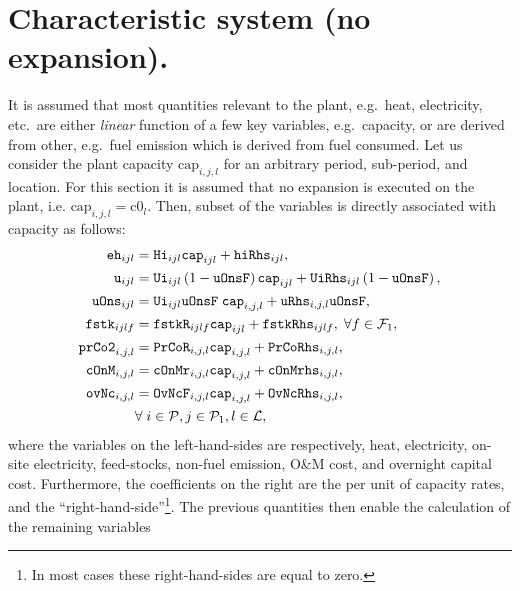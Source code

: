 \documentclass{amsart}
\begin{document}
\section{Characteristic system (no expansion).}\label{sec:char_sys}
%
It is assumed that most quantities relevant to the plant, e.g.\ heat,
electricity, etc.\ are either \emph{linear} function of a few key variables,
e.g.\ capacity, or are derived from other, e.g.\ fuel emission which is derived
from fuel consumed.  Let us consider the plant capacity $\text{cap}_{i,j,l}$ for
an arbitrary period, sub-period, and location.  For this section it is assumed
that no expansion is executed on the plant, i.e.
$\text{cap}_{i,j,l}=\text{c0}_{l}$.  Then, subset of the variables is directly
associated with capacity as follows:
%
\begin{align}\label{eq:eqset1}
    \mathtt{eh}_{ijl} &= \mathtt{Hi}_{ijl} \mathtt{cap}_{ijl} 
    + \mathtt{hiRhs}_{ijl}, \\
    \mathtt{u}_{ijl}  &= 
    \mathtt{Ui}_{ijl}\left(1-\mathtt{uOnsF}\right)\mathtt{cap}_{ijl} 
    + \mathtt{UiRhs}_{ijl} \left(1 - \mathtt{uOnsF}\right), \\
    \mathtt{uOns}_{ijl}  &= 
    \mathtt{Ui}_{ijl}  \mathtt{uOnsF} \; 
    \mathtt{cap}_{i,j,l} + \mathtt{uRhs}_{i,j,l} \mathtt{uOnsF}, \\
    \mathtt{fstk}_{ijlf}  &= 
    \mathtt{fstkR}_{ijlf}  
    \mathtt{cap}_{ijl} + \mathtt{fstkRhs}_{ijlf},\; \forall f \in \mathcal{F}_1, 
    \\
    \mathtt{prCo2}_{i,j,l} &= \mathtt{PrCoR}_{i,j,l} \mathtt{cap}_{i,j,l} 
    + \mathtt{PrCoRhs}_{i,j,l}, \\
    \mathtt{cOnM}_{i,j,l} &= 
    \mathtt{cOnMr}_{i,j,l} \mathtt{cap}_{i,j,l} +
    \mathtt{cOnMrhs}_{i,j,l},
    \\
    \mathtt{ovNc}_{i,j,l} &= \mathtt{OvNcF}_{i,j,l} \mathtt{cap}_{i,j,l}
    + \mathtt{OvNcRhs}_{i,j,l}, \\
    & \forall \; i \in \mathcal{P},j \in \mathcal{P}_1 ,
    l \in \mathcal{L}, \notag
\end{align}
%
where the variables on the left-hand-sides are respectively, heat, electricity,
on-site electricity, feed-stocks, non-fuel emission, O\&M cost, and overnight
capital cost.  Furthermore, the coefficients on the right are the per unit of
capacity rates, and the ``right-hand-side''\footnote{In most cases these
right-hand-sides are equal to zero.}.
%
The previous quantities then enable the calculation of the remaining variables
\end{document}
